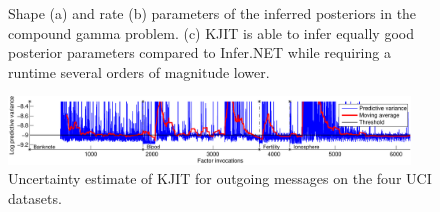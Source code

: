 \documentclass[english]{article}
\theoremstyle{plain}
\theoremstyle{plain}
\begin{document}
\begin{figure}[ht]
  \centering
  \caption{Shape (a) and rate (b) parameters of the inferred posteriors in 
  the compound gamma problem. 
  (c) KJIT is able to infer equally good posterior parameters compared to Infer.NET 
  while requiring a runtime several orders of magnitude lower. }
  \label{fig:cg_performance}
\end{figure}


\begin{figure}[t]
\centering
\includegraphics[width=0.95\textwidth]{img/online/uci_temporal_uncertainty-crop}
\caption{
Uncertainty estimate of KJIT for outgoing messages on the four UCI datasets.
\label{fig:uci_temporal_uncertainty}
}
\end{figure}
\end{document}
